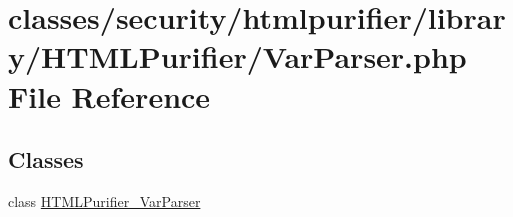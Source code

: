 \hypertarget{VarParser_8php}{\section{classes/security/htmlpurifier/library/\+H\+T\+M\+L\+Purifier/\+Var\+Parser.php File Reference}
\label{VarParser_8php}
}
\subsection*{Classes}
\begin{DoxyCompactItemize}
\item 
class \hyperlink{classHTMLPurifier__VarParser}{H\+T\+M\+L\+Purifier\+\_\+\+Var\+Parser}
\end{DoxyCompactItemize}
